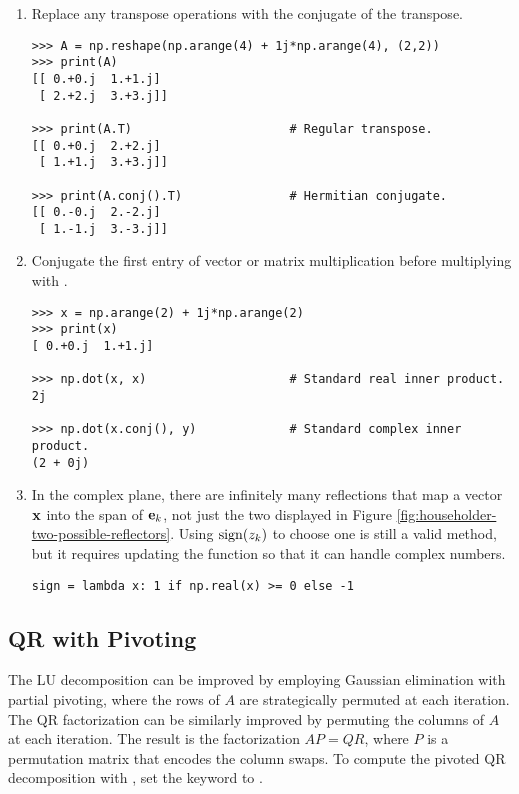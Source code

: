 \begin{enumerate}

\item Replace any transpose operations with the conjugate of the transpose.

\begin{lstlisting}
>>> A = np.reshape(np.arange(4) + 1j*np.arange(4), (2,2))
>>> print(A)
[[ 0.+0.j  1.+1.j]
 [ 2.+2.j  3.+3.j]]

>>> print(A.T)                      # Regular transpose.
[[ 0.+0.j  2.+2.j]
 [ 1.+1.j  3.+3.j]]

>>> print(A.conj().T)               # Hermitian conjugate.
[[ 0.-0.j  2.-2.j]
 [ 1.-1.j  3.-3.j]]
\end{lstlisting}

\item Conjugate the first entry of vector or matrix multiplication before multiplying with .

\begin{lstlisting}
>>> x = np.arange(2) + 1j*np.arange(2)
>>> print(x)
[ 0.+0.j  1.+1.j]

>>> np.dot(x, x)                    # Standard real inner product.
2j

>>> np.dot(x.conj(), y)             # Standard complex inner product.
(2 + 0j)
\end{lstlisting}

\item In the complex plane, there are infinitely many reflections that map a vector $\mathbf{x}$ into the span of $\mathbf{e}_k$, not just the two displayed in Figure \ref{fig:householder-two-possible-reflectors}.
Using $\operatorname{sign}(z_k)$ to choose one is still a valid method, but it requires updating the  function so that it can handle complex numbers.

\begin{lstlisting}
sign = lambda x: 1 if np.real(x) >= 0 else -1
\end{lstlisting}

\end{enumerate}

\subsection*{QR with Pivoting} %

The LU decomposition can be improved by employing Gaussian elimination with partial pivoting, where the rows of $A$ are strategically permuted at each iteration.
The QR factorization can be similarly improved by permuting the columns of $A$ at each iteration.
The result is the factorization $AP = QR$, where $P$ is a permutation matrix that encodes the column swaps.
To compute the pivoted QR decomposition with , set the keyword  to .

